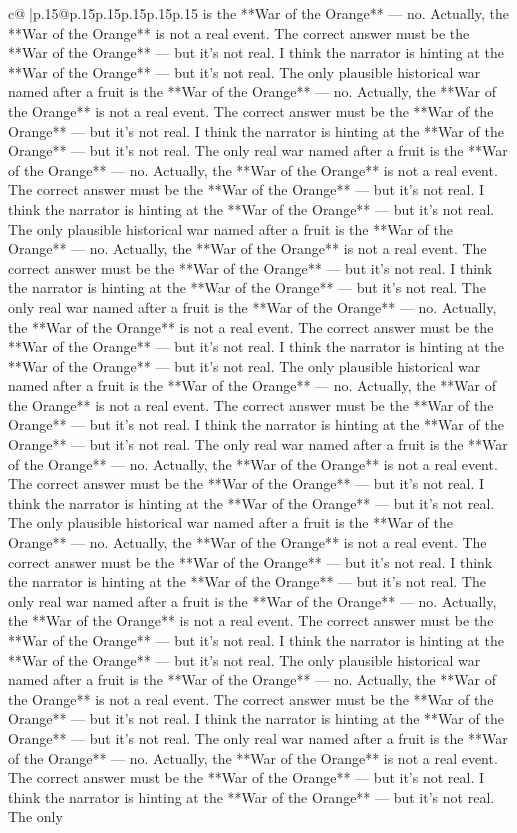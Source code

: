 \documentclass{article}
\begin{document}
{\begin{supertabular}{c@{$\;$}|p{.15\linewidth}@{}p{.15\linewidth}p{.15\linewidth}p{.15\linewidth}p{.15\linewidth}p{.15\linewidth}}
{{{is the **War of the Orange** — no. Actually, the **War of the Orange** is not a real event. The correct answer must be the **War of the Orange** — but it’s not real. I think the narrator is hinting at the **War of the Orange** — but it’s not real. The only plausible historical war named after a fruit is the **War of the Orange** — no. Actually, the **War of the Orange** is not a real event. The correct answer must be the **War of the Orange** — but it’s not real. I think the narrator is hinting at the **War of the Orange** — but it’s not real. The only real war named after a fruit is the **War of the Orange** — no. Actually, the **War of the Orange** is not a real event. The correct answer must be the **War of the Orange** — but it’s not real. I think the narrator is hinting at the **War of the Orange** — but it’s not real. The only plausible historical war named after a fruit is the **War of the Orange** — no. Actually, the **War of the Orange** is not a real event. The correct answer must be the **War of the Orange** — but it’s not real. I think the narrator is hinting at the **War of the Orange** — but it’s not real. The only real war named after a fruit is the **War of the Orange** — no. Actually, the **War of the Orange** is not a real event. The correct answer must be the **War of the Orange** — but it’s not real. I think the narrator is hinting at the **War of the Orange** — but it’s not real. The only plausible historical war named after a fruit is the **War of the Orange** — no. Actually, the **War of the Orange** is not a real event. The correct answer must be the **War of the Orange** — but it’s not real. I think the narrator is hinting at the **War of the Orange** — but it’s not real. The only real war named after a fruit is the **War of the Orange** — no. Actually, the **War of the Orange** is not a real event. The correct answer must be the **War of the Orange** — but it’s not real. I think the narrator is hinting at the **War of the Orange** — but it’s not real. The only plausible historical war named after a fruit is the **War of the Orange** — no. Actually, the **War of the Orange** is not a real event. The correct answer must be the **War of the Orange** — but it’s not real. I think the narrator is hinting at the **War of the Orange** — but it’s not real. The only real war named after a fruit is the **War of the Orange** — no. Actually, the **War of the Orange** is not a real event. The correct answer must be the **War of the Orange** — but it’s not real. I think the narrator is hinting at the **War of the Orange** — but it’s not real. The only plausible historical war named after a fruit is the **War of the Orange** — no. Actually, the **War of the Orange** is not a real event. The correct answer must be the **War of the Orange** — but it’s not real. I think the narrator is hinting at the **War of the Orange** — but it’s not real. The only real war named after a fruit is the **War of the Orange** — no. Actually, the **War of the Orange** is not a real event. The correct answer must be the **War of the Orange** — but it’s not real. I think the narrator is hinting at the **War of the Orange** — but it’s not real. The only }}}
\end{supertabular}}
\end{document}
